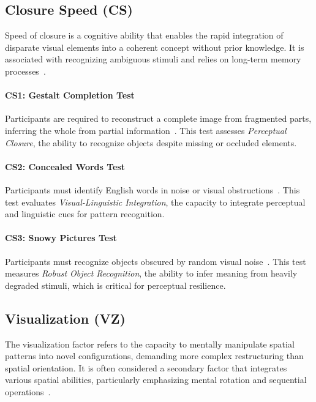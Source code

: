 \subsection{Closure Speed (CS)}

Speed of closure is a cognitive ability that enables the rapid integration of disparate visual elements into a coherent concept without prior knowledge.
It is associated with recognizing ambiguous stimuli and relies on long-term memory processes~\cite{frederiksen1967cognitive, hoffman1968factor}.

\paragraph{CS1: Gestalt Completion Test}

Participants are required to reconstruct a complete image from fragmented parts, inferring the whole from partial information~\cite{street1968street}.
This test assesses \textit{Perceptual Closure}, the ability to recognize objects despite missing or occluded elements.

\paragraph{CS2: Concealed Words Test}

Participants must identify English words in noise or visual obstructions~\cite{thurstone1944factorial}.
This test evaluates \textit{Visual-Linguistic Integration}, the capacity to integrate perceptual and linguistic cues for pattern recognition.

\paragraph{CS3: Snowy Pictures Test}

Participants must recognize objects obscured by random visual noise~\cite{ekstrom1976manual}.
This test measures \textit{Robust Object Recognition}, the ability to infer meaning from heavily degraded stimuli, which is critical for perceptual resilience.

\subsection{Visualization (VZ)}

The visualization factor refers to the capacity to mentally manipulate spatial patterns into novel configurations, demanding more complex restructuring than spatial orientation.
It is often considered a secondary factor that integrates various spatial abilities, particularly emphasizing mental rotation and sequential operations~\cite{carroll1976psychometric}.

